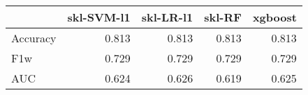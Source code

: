 \begin{tabular}{lrrrr}
\toprule
{} &  skl-SVM-l1 &  skl-LR-l1 &  skl-RF &  xgboost \\
\midrule
Accuracy &       0.813 &      0.813 &   0.813 &    0.813 \\
F1w      &       0.729 &      0.729 &   0.729 &    0.729 \\
AUC      &       0.624 &      0.626 &   0.619 &    0.625 \\
\bottomrule
\end{tabular}
